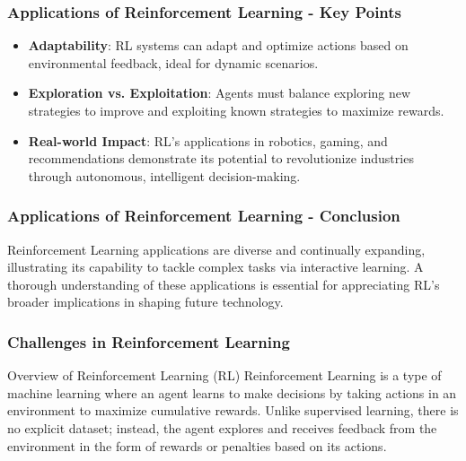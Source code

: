 \documentclass[aspectratio=169]{beamer}
\begin{document}
\begin{frame}[fragile]
    \frametitle{Applications of Reinforcement Learning - Key Points}
    \begin{itemize}
        \item \textbf{Adaptability}: RL systems can adapt and optimize actions based on environmental feedback, ideal for dynamic scenarios.
        \item \textbf{Exploration vs. Exploitation}: Agents must balance exploring new strategies to improve and exploiting known strategies to maximize rewards.
        \item \textbf{Real-world Impact}: RL's applications in robotics, gaming, and recommendations demonstrate its potential to revolutionize industries through autonomous, intelligent decision-making.
    \end{itemize}
\end{frame}

\begin{frame}[fragile]
    \frametitle{Applications of Reinforcement Learning - Conclusion}
    Reinforcement Learning applications are diverse and continually expanding, illustrating its capability to tackle complex tasks via interactive learning. A thorough understanding of these applications is essential for appreciating RL's broader implications in shaping future technology.
\end{frame}

\begin{frame}[fragile]
    \frametitle{Challenges in Reinforcement Learning}
    \begin{block}{Overview of Reinforcement Learning (RL)}
        Reinforcement Learning is a type of machine learning where an agent learns to make decisions by taking actions in an environment to maximize cumulative rewards. Unlike supervised learning, there is no explicit dataset; instead, the agent explores and receives feedback from the environment in the form of rewards or penalties based on its actions.
    \end{block}
\end{frame}
\end{document}
